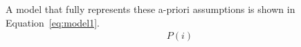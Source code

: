 A model that fully represents these a-priori assumptions is shown in Equation~\ref{eq:model1}.
\begin{align}
    P(i)
\end{align}
